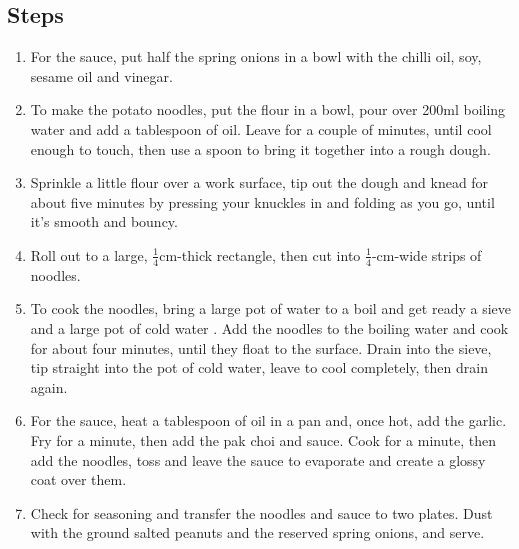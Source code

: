 \documentclass{book}
\begin{document}
\subsection*{Steps}
\begin{enumerate}
\item For the sauce, put half the spring onions in a bowl with the chilli oil, soy, sesame oil and vinegar.
\item To make the potato noodles, put the flour in a bowl, pour over 200ml boiling water and add a tablespoon of oil. Leave for a couple of minutes, until cool enough to touch, then use a spoon to bring it together into a rough dough.
\item Sprinkle a little flour over a work surface, tip out the dough and knead for about five minutes by pressing your knuckles in and folding as you go, until it’s smooth and bouncy.
\item Roll out to a large, $\frac{1}{4}$cm-thick rectangle, then cut into $\frac{1}{4}$-cm-wide strips of noodles.
\item To cook the noodles, bring a large pot of water to a boil and get ready a sieve and a large pot of cold water . Add the noodles to the boiling water and cook for about four minutes, until they float to the surface. Drain into the sieve, tip straight into the pot of cold water, leave to cool completely, then drain again.
\item For the sauce, heat a tablespoon of oil in a pan and, once hot, add the garlic. Fry for a minute, then add the pak choi and sauce. Cook for a minute, then add the noodles, toss and leave the sauce to evaporate and create a glossy coat over them.
\item Check for seasoning and transfer the noodles and sauce to two plates. Dust with the ground salted peanuts and the reserved spring onions, and serve.
\end{enumerate}
\newpage
\end{document}
